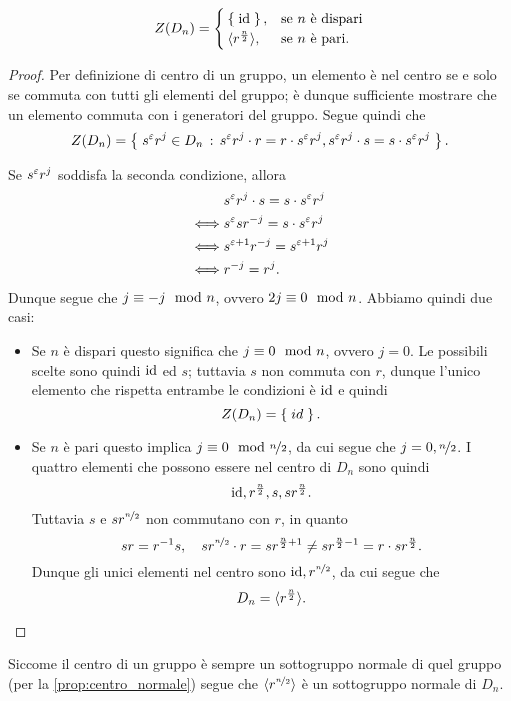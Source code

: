 \begin{proposition}
    \[
        Z(D_n) = \begin{cases}
            \left\{\;\operatorname{id}\;\right\}, &\text{se } n \text{ è dispari}\\
            \langle r^{\frac{n}2}\rangle, &\text{se $n$ è pari}.
        \end{cases}   
    \]
\end{proposition}
\begin{proof}
    Per definizione di centro di un gruppo, un elemento è nel centro se e solo se commuta con tutti gli elementi del gruppo; è dunque sufficiente mostrare che un elemento commuta con i generatori del gruppo. Segue quindi che \[
        Z(D_n) = \left\{\;s^\varepsilon r^j \in D_n \,:\, s^\varepsilon r^j \cdot r = r \cdot s^\varepsilon r^j, s^\varepsilon r^j \cdot s = s \cdot s^\varepsilon r^j\;\right\}.
    \]

    Se $s^\varepsilon r^j$ soddisfa la seconda condizione, allora \begin{align*}
        &s^\varepsilon r^j \cdot s = s \cdot s^\varepsilon r^j \\
        \iff &s^\varepsilon sr^{-j} = s \cdot s^\varepsilon r^j  \\
        \iff &s^{\varepsilon + 1}r^{-j} = s^{\varepsilon + 1} r^j\\
        \iff &r^{-j} = r^j.
    \end{align*} Dunque segue che $j \equiv -j \mod{n}$, ovvero $2j \equiv 0 \mod{n}$. Abbiamo quindi due casi:
    \begin{itemize}
        \item Se $n$ è dispari questo significa che $j \equiv 0 \mod{n}$, ovvero $j = 0$. 
        Le possibili scelte sono quindi $\operatorname{id}$ ed $s$; tuttavia $s$ non commuta con $r$, dunque l'unico elemento che rispetta entrambe le condizioni è $\operatorname{id}$ e quindi \[
            Z(D_n) = \left\{\;id\;\right\}.    
        \]
        \item Se $n$ è pari questo implica $j \equiv 0 \mod{\nicefrac{n}2}$, da cui segue che $j = 0, \nicefrac{n}2$. I quattro elementi che possono essere nel centro di $D_n$ sono quindi \[
            \operatorname{id}, r^{\frac{n}2}, s, sr^\frac{n}{2}.   
        \] Tuttavia $s$ e $sr^{\nicefrac{n}{2}}$ non commutano con $r$, in quanto \[
            sr = r^{-1} s, \quad sr^{\nicefrac{n}{2}} \cdot r = sr^{\frac{n}{2} + 1} \neq sr^{\frac{n}{2} - 1} = r \cdot sr^\frac{n}{2}.
    \]  Dunque gli unici elementi nel centro sono $\operatorname{id}, r^{\nicefrac{n}{2}}$, da cui segue che \[
        D_n = \langle r^\frac{n}{2}\rangle. \qedhere    
    \]
    \end{itemize}
\end{proof}

Siccome il centro di un gruppo è sempre un sottogruppo normale di quel gruppo (per la \autoref{prop:centro_normale}) segue che $\langle r^{\nicefrac{n}{2}}\rangle$ è un sottogruppo normale di $D_n$.